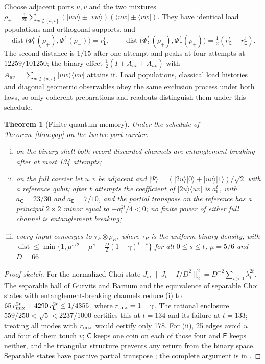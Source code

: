 \documentclass[11pt]{article}
\newtheorem{theorem}{Theorem}[section]
\theoremstyle{definition}
\theoremstyle{remark}
\theoremstyle{plain}
\newcommand{\ket}[1]{\lvert #1\rangle}
\newcommand{\bra}[1]{\langle #1\rvert}
\newcommand{\Cn}{\mathsf{C}}
\newcommand{\En}{\mathsf{E}}
\newcommand{\dist}{\operatorname{dist}}
\begin{document}
Choose adjacent ports $u,v$ and the two mixtures
$\rho_\pm=\frac1{20}\sum_{w\notin\{u,v\}}(\ket{uw}\pm\ket{vw})(\bra{uw}\pm\bra{vw})$.
They have identical load populations and orthogonal supports, and
\[
\dist\bigl(\Phi^t_{\mathsf L}(\rho_+),\Phi^t_{\mathsf L}(\rho_-)\bigr)=r_{\mathsf L}^t,\qquad
\dist\bigl(\Phi^t_\Cn(\rho_+),\Phi^t_\En(\rho_+)\bigr)=\tfrac12(r_\Cn^t-r_\En^t).
\]
The second distance is $1/15$ after one attempt and peaks at four attempts at
$12259/101250$; the binary effect $\frac12(I+A_{uv}+A_{uv}^\dagger)$ with
$A_{uv}=\sum_{w\notin\{u,v\}}\ket{uw}\bra{vw}$ attains it. Load populations,
classical load histories and diagonal geometric observables obey the same
exclusion process under both laws, so only coherent preparations and readouts
distinguish them under this schedule.

\begin{theorem}[Finite quantum memory]
\label{thm:memory}
Under the schedule of Theorem~\ref{thm:gap} on the twelve-port carrier:
\begin{enumerate}[(i)]
\item on the binary shell both record-discarded channels are entanglement
breaking after at most 134 attempts;
\item on the full carrier let $u,v$ be adjacent and
$\ket\Psi=(\ket{2u}\ket0+\ket{uv}\ket1)/\sqrt2$ with a reference qubit; after
$t$ attempts the coefficient of $\ket{2u}\bra{uv}$ is $a_{\mathsf L}^t$, with
$a_\Cn=23/30$ and $a_\En=7/10$, and the partial transpose on the reference
has a principal $2\times2$ minor equal to $-a_{\mathsf L}^{2t}/4<0$; no finite
power of either full channel is entanglement breaking;
\item every input converges to $\tau_P\otimes\rho_R$, where $\tau_P$ is the
uniform binary density, with
$\dist\le\min\{1,\mu^{s/2}+\mu^s+\tfrac{D}{2}(1-\gamma)^{t-s}\}$ for all
$0\le s\le t$, $\mu=5/6$ and $D=66$.
\end{enumerate}
\end{theorem}

\begin{proof}[Proof sketch]
For the normalized Choi state $J_t$,
$\lVert J_t-I/D^2\rVert_2^2=D^{-2}\sum_{i>0}\lambda_i^{2t}$. The separable
ball of Gurvits and Barnum \cite{gurvits2002} and the equivalence of
separable Choi states with entanglement-breaking channels \cite{horodecki2003}
reduce (i) to $65\,r_{\rm mix}^{2t}+4290\,r_{\mathsf L}^{2t}\le1/4355$, where
$r_{\rm mix}=1-\gamma$. The rational enclosure
$559/250<\sqrt5<2237/1000$ certifies this at $t=134$ and its failure at
$t=133$; treating all modes with $r_{\rm mix}$ would certify only 178. For
(ii), 25 edges avoid $u$ and four of them touch $v$; $\Cn$ keeps one coin on
each of those four and $\En$ keeps neither, and the triangular structure
prevents any return from the binary space. Separable states have positive
partial transpose \cite{peres1996}; the complete argument is in
\cite{oQM,rQM}.
\end{proof}
\end{document}
